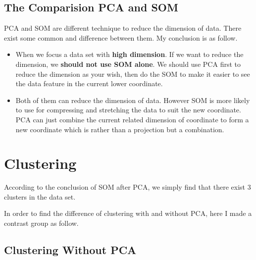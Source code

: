 \documentclass[titlepage,a4paper,12pt,thmsb]{report}
\begin{document}
\newpage

\subsection{The Comparision PCA and SOM}

PCA and SOM are different technique to reduce the dimension of data. There exist some common and difference between them. My conclusion is as follow.

\begin{itemize}
\item{When we focus a data set with {\bf high dimension}. If we want to reduce the dimension, we {\bf should not use SOM alone}. We should use PCA first to reduce the dimension as your wish, then do the SOM to make it easier to see the data feature in the current lower coordinate.}
\item{Both of them can reduce the dimension of data. However SOM is more likely to use for compressing and stretching the data to suit the new coordinate. PCA can just combine the current related dimension of  coordinate to form a new coordinate which is rather than a projection but a  combination. }
\end{itemize}

\newpage

\section{Clustering}
According to the conclusion of SOM after PCA, we simply find that there exist 3 clusters in the data set.

In order to find the difference of clustering with and without PCA, here I made a contrast group as follow.


\subsection{Clustering Without PCA}

\begin{center}
\begin{figure}[h]
{\par}
\end{figure}
{}
\end{center}
\end{document}
